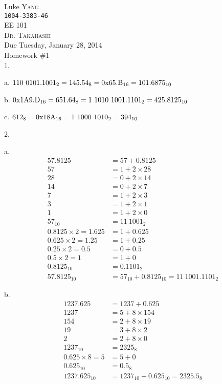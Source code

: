 \documentclass[UTF8,12pt,letterpaper,oneside]{amsart}
\begin{document}
\noindent Luke \textsc{Yang}\\
\texttt{1004-3383-46}\\
EE 101\\
\textsc{Dr.} \textsc{Takahashi}\\
Due Tuesday, January 28, 2014\\
Homework \#1\\

1.

a. $\rm 110\ 0101.1001_2 = 145.54_8 = 0x65.B_{16} = 101.6875_{10}$ 

b. $\rm 0x1A9.D_{16} = 651.64_8 = 1\ 1010\ 1001.1101_2 = 425.8125_{10}$

c. $\rm 612_8 = 0x18A_{16} = 1\ 1000\ 1010_2 = 394_{10}$

2.

a. \begin{equation*}\begin{split}
57.8125 &= 57 + 0.8125\\
57 &= 1 + 2 \times 28\\
28 &= 0 + 2 \times 14\\
14 &= 0 + 2 \times  7\\
 7 &= 1 + 2 \times  3\\
 3 &= 1 + 2 \times  1\\
 1 &= 1 + 2 \times  0\\
57_{10} &= 11\ 1001_2\\ 
0.8125 \times 2 = 1.625 &= 1 + 0.625\\
0.625  \times 2 = 1.25  &= 1 + 0.25\\
0.25   \times 2 = 0.5   &= 0 + 0.5\\
0.5    \times 2 = 1     &= 1 + 0\\
0.8125_{10} &= 0.1101_2\\
57.8125_{10} &= 57_{10} + 0.8125_{10} = 11\ 1001.1101_2
\end{split}\end{equation*}

b. \begin{equation*}\begin{split}
1237.625 &= 1237 + 0.625\\
1237 &= 5 + 8 \times 154\\
 154 &= 2 + 8 \times 19\\
  19 &= 3 + 8 \times 2\\
   2 &= 2 + 8 \times 0\\
1237_{10} &= 2325_8\\   
0.625 \times 8 = 5 &= 5 + 0\\
0.625_{10} &= 0.5_8\\
1237.625_{10} &= 1237_{10} + 0.625_{10} = 2325.5_8
\end{split}\end{equation*}
\end{document}
